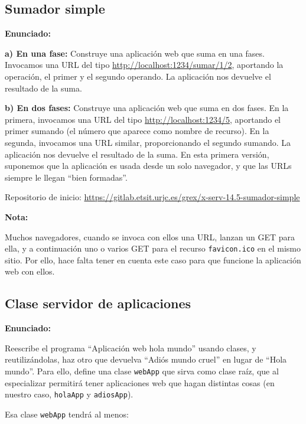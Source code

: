 \subsection{Sumador simple}
\label{subsec:sumador-simple}

\textbf{Enunciado:}

{\bf a) En una fase:} Construye una aplicación web que suma en una fases. Invocamos una URL del tipo \url{http://localhost:1234/sumar/1/2}, aportando la operación, el primer y el segundo operando. La aplicación nos devuelve el resultado de la suma.

{\bf b) En dos fases: } Construye una aplicación web que suma en dos fases. En la primera, invocamos una URL del tipo \url{http://localhost:1234/5}, aportando el primer sumando (el número que aparece como nombre de recurso). En la segunda, invocamos una URL similar, proporcionando el segundo sumando. La aplicación nos devuelve el resultado de la suma. En esta primera versión, suponemos que la aplicación es usada desde un solo navegador, y que las URLs siempre le llegan ``bien formadas''.

Repositorio de inicio: \url{https://gitlab.etsit.urjc.es/grex/x-serv-14.5-sumador-simple}

\textbf{Nota:}

Muchos navegadores, cuando se invoca con ellos una URL, lanzan un GET para ella, y a continuación uno o varios GET para el recurso \texttt{favicon.ico} en el mismo sitio. Por ello, hace falta tener en cuenta este caso para que funcione la aplicación web con ellos.

\subsection{Clase servidor de aplicaciones}
\label{subsec:clase-serv-aplis}

\textbf{Enunciado:}

Reescribe el programa ``Aplicación web hola mundo'' usando clases, y reutilizándolas, haz otro que devuelva ``Adiós mundo cruel'' en lugar de ``Hola mundo''. Para ello, define una clase \texttt{webApp} que sirva como clase raíz, que al especializar permitirá tener aplicaciones web que hagan distintas cosas (en nuestro caso, \texttt{holaApp} y \texttt{adiosApp}).

Esa clase \texttt{webApp} tendrá al menos:

